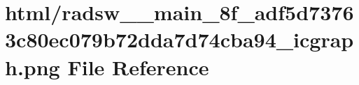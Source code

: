 \hypertarget{radsw____main__8f__adf5d73763c80ec079b72dda7d74cba94__icgraph_8png}{}\section{html/radsw\+\_\+\+\_\+main\+\_\+8f\+\_\+adf5d73763c80ec079b72dda7d74cba94\+\_\+icgraph.png File Reference}
\label{radsw____main__8f__adf5d73763c80ec079b72dda7d74cba94__icgraph_8png}
